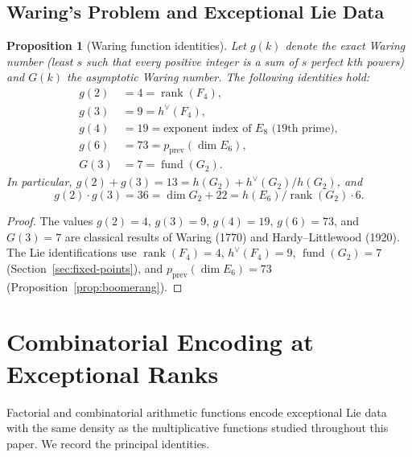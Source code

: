 \documentclass[11pt]{amsart}
\theoremstyle{plain}
\newtheorem{proposition}[theorem]{Proposition}
\theoremstyle{definition}
\theoremstyle{remark}
\begin{document}
\subsection{Waring's Problem and Exceptional Lie Data}

\begin{proposition}[Waring function identities]
\label{prop:waring}
Let $g(k)$ denote the exact Waring number (least $s$ such that every
positive integer is a sum of $s$ perfect $k$th powers) and $G(k)$ the
asymptotic Waring number. The following identities hold:
\begin{align*}
  g(2) &= 4 = \operatorname{rank}(F_4),\\
  g(3) &= 9 = h^\vee(F_4),\\
  g(4) &= 19 = \text{exponent index of } E_8
             \text{ (19th prime)},\\
  g(6) &= 73 = p_{\mathrm{prev}}(\dim E_6),\\
  G(3) &= 7  = \operatorname{fund}(G_2).
\end{align*}
In particular, $g(2) + g(3) = 13 = h(G_2) + h^\vee(G_2)/h(G_2)$, and
\[
  g(2) \cdot g(3) = 36 = \dim G_2 + 22 = h(E_6)/\!\operatorname{rank}(G_2)\cdot 6.
\]
\end{proposition}

\begin{proof}
The values $g(2)=4$, $g(3)=9$, $g(4)=19$, $g(6)=73$, and $G(3)=7$
are classical results of Waring (1770) and Hardy--Littlewood (1920).
The Lie identifications use
$\operatorname{rank}(F_4)=4$, $h^\vee(F_4)=9$,
$\operatorname{fund}(G_2)=7$ (Section~\ref{sec:fixed-points}),
and $p_{\mathrm{prev}}(\dim E_6)=73$ (Proposition~\ref{prop:boomerang}).
\end{proof}


\section{Combinatorial Encoding at Exceptional Ranks}%
\label{sec:combinatorial-exceptional}

Factorial and combinatorial arithmetic functions encode exceptional Lie
data with the same density as the multiplicative functions studied
throughout this paper.  We record the principal identities.
\end{document}
